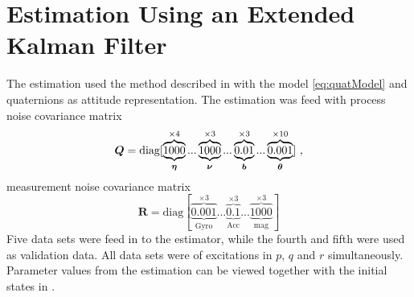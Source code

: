 \section{Estimation Using an Extended Kalman Filter}\label{sec:estimKalman}
The \abbrEKF estimation used the method described in  with the model \eqref{eq:quatModel} and quaternions as attitude representation. The estimation was feed with process noise covariance matrix
\begin{equation*}
\boldsymbol{Q}=\text{diag}[\underbrace{\overbrace{1000}^{\times4}}_{\boldsymbol{\eta}}... \underbrace{\overbrace{1000}^{\times3}}_{\boldsymbol{\nu}}...\underbrace{\overbrace{0.01}^{\times3}}_{\boldsymbol{b}}... \underbrace{\overbrace{0.001}^{\times10}}_{\boldsymbol{\theta}}]\text{ ,}
\end{equation*}
measurement noise covariance matrix
\begin{equation*}
\boldsymbol{R} = \text{diag}[\underbrace{\overbrace{0.001}^{\times3}}_{\text{Gyro}}... \underbrace{\overbrace{0.1}^{\times3}}_{\text{Acc}}... \underbrace{\overbrace{1000}^{\times3}}_{\text{mag}}]
\end{equation*}
Five data sets were feed in to the estimator, while the fourth and fifth were used as validation data. All data sets were of excitations in $p$, $q$ and $r$ simultaneously. Parameter values from the estimation can be viewed together with the initial states in .
